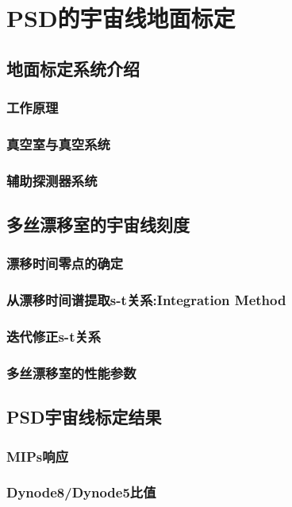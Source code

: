 \chapter{PSD的宇宙线地面标定}
\label{ch:cosmicray_calibration}
\section{地面标定系统介绍}
\subsection{工作原理}
\subsection{真空室与真空系统}
\subsection{辅助探测器系统}

\section{多丝漂移室的宇宙线刻度}
\subsection{漂移时间零点的确定}
\subsection{从漂移时间谱提取s-t关系:Integration Method}
\subsection{迭代修正s-t关系}
\subsection{多丝漂移室的性能参数}

\section{PSD宇宙线标定结果}
\subsection{MIPs响应}
\subsection{Dynode8/Dynode5比值}
